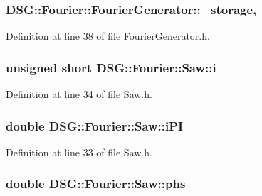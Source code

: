 \hypertarget{classDSG_1_1Fourier_1_1FourierGenerator_a43799227375e2d8b1354682e3a4fc935}{
\subsubsection[{\-\_\-storage}]{ D\-S\-G\-::\-Fourier\-::\-Fourier\-Generator\-::\-\_\-storage\hspace{0.3cm}{\ttfamily [protected]}, {\ttfamily [inherited]}}}\label{classDSG_1_1Fourier_1_1FourierGenerator_a43799227375e2d8b1354682e3a4fc935}


Definition at line 38 of file Fourier\-Generator.\-h.

\hypertarget{classDSG_1_1Fourier_1_1Saw_a49dc2b9a40a17a4d239f72750e368cb9}{
\subsubsection[{i}]{\setlength{\rightskip}{0pt plus 5cm}unsigned short D\-S\-G\-::\-Fourier\-::\-Saw\-::i\hspace{0.3cm}{\ttfamily [protected]}}}\label{classDSG_1_1Fourier_1_1Saw_a49dc2b9a40a17a4d239f72750e368cb9}


Definition at line 34 of file Saw.\-h.

\hypertarget{classDSG_1_1Fourier_1_1Saw_afeeaf783a6098cb747b8ab6560e6e24e}{
\subsubsection[{i\-P\-I}]{\setlength{\rightskip}{0pt plus 5cm}double D\-S\-G\-::\-Fourier\-::\-Saw\-::i\-P\-I\hspace{0.3cm}{\ttfamily [protected]}}}\label{classDSG_1_1Fourier_1_1Saw_afeeaf783a6098cb747b8ab6560e6e24e}


Definition at line 33 of file Saw.\-h.

\hypertarget{classDSG_1_1Fourier_1_1Saw_a09a244f75987cb7903eeeabf2abe5245}{
\subsubsection[{phs}]{\setlength{\rightskip}{0pt plus 5cm}double D\-S\-G\-::\-Fourier\-::\-Saw\-::phs\hspace{0.3cm}{\ttfamily [protected]}}}\label{classDSG_1_1Fourier_1_1Saw_a09a244f75987cb7903eeeabf2abe5245}


